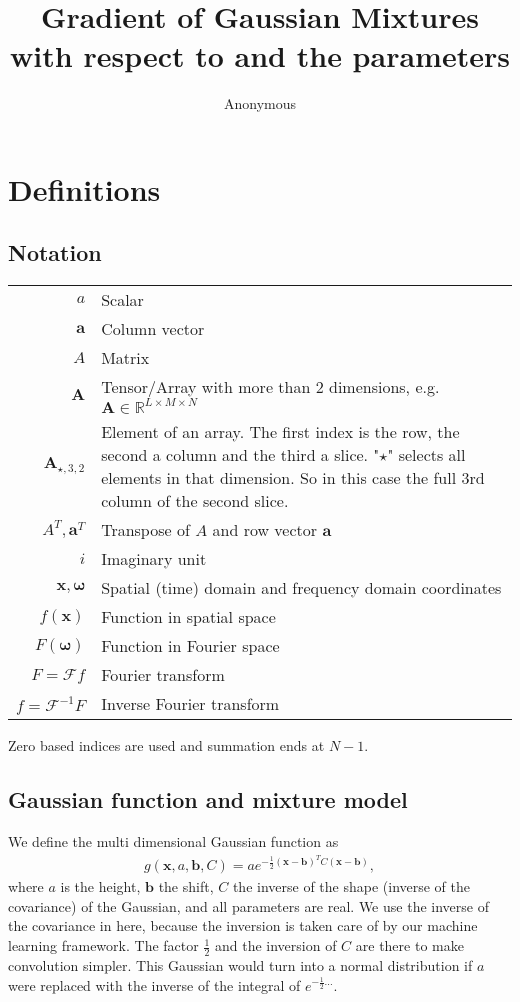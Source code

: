 \documentclass{paper}
\title{Gradient of Gaussian Mixtures with respect to \vr{x} and the parameters}
\author{Anonymous}
\newcommand{\F}{\ensuremath{\mathcal{F}}}
\newcommand{\vr}[1]{\ensuremath{\boldsymbol{#1}}}
\newcommand{\mx}[1]{\ensuremath{#1}}
\newcommand{\tr}[1]{\ensuremath{\boldsymbol{#1}}}
\begin{document}
\maketitle

\section{Definitions}
\subsection*{Notation}
\begin{center}
	\begin{supertabular}{rp{8cm}}
		$a$	& Scalar \\
		$\vr{a}$	& Column vector \\
		$\mx{A}$			& Matrix \\ 
		$\tr{A}$	& Tensor/Array with more than 2 dimensions, e.g. $\tr{A} \in \mathbb{R}^{L \times M \times N}$ \\ 
		$\tr{A}_{\star, 3, 2}$
					& Element of an array.
					The first index is the row, the second a column and the third a slice.
					"$\star$" selects all elements in that dimension.
					So in this case the full 3rd column of the second slice. \\ 
		$A^T, \vr{a}^T$
					& Transpose of $A$ and row vector $\vr{a}$ \\
		$i$			& Imaginary unit \\
		$\vr{x}, \vr{\omega}$
					& Spatial (time) domain and frequency domain coordinates \\
		$f(\vr{x})$
					& Function in spatial space \\
		$F(\vr{\omega})$
					& Function in Fourier space \\
		$F = \F f$
					& Fourier transform \\
		$f = \F^{-1} F$
					& Inverse Fourier transform \\
	\end{supertabular}
\end{center}
Zero based indices are used and summation ends at $N-1$.

\subsection*{Gaussian function and mixture model}
We define the multi dimensional Gaussian function as
\begin{align}
\label{eq:gaussian_definition}
g(\vr{x}, a, \vr{b}, C) = a e^{-\frac{1}{2}(\vr{x}-\vr{b})^TC(\vr{x}-\vr{b})},
\end{align}
where $a$ is the height, $\vr{b}$ the shift, $C$ the inverse of the shape (inverse of the covariance) of the Gaussian, and all parameters are real.
We use the inverse of the covariance in here, because the inversion is taken care of by our machine learning framework.
The factor $\frac{1}{2}$ and the inversion of $C$ are there to make convolution simpler.
This Gaussian would turn into a normal distribution if $a$ were replaced with the inverse of the integral of $e^{-\frac{1}{2}...}$.
\end{document}
